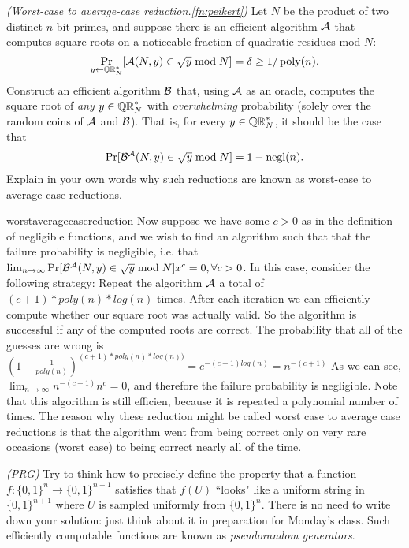 \begin{questions}
  \question[6] 
	\emph{(Worst-case to average-case reduction.\cref{fn:peikert})}
    Let $N$ be the product of two distinct $n$-bit primes,
    and suppose there is an efficient algorithm $\mathcal{A}$ that computes
    square roots on a noticeable fraction of quadratic residues mod
    $N$: \[ \Pr_{y \gets \mathbb{QR}_{N}^{*}}[\mathcal{A}(N, y) \in \sqrt{y} \bmod N] =
    \delta \geq 1/\operatorname{poly}(n). \] Construct an efficient algorithm
    $\mathcal{B}$ that, using $\mathcal{A}$ as an oracle, computes the square root
    of \emph{any} $y \in \mathbb{QR}_{N}^{*}$ with \emph{overwhelming} probability
    (solely over the random coins of $\mathcal{A}$ and $\mathcal{B}$).  That is,
    for every $y \in \mathbb{QR}_{N}^{*}$, it should be the case that
    \[ \Pr[\mathcal{B}^{\mathcal{A}}(N, y) \in \sqrt{y} \bmod N] = 1 - \operatorname{negl}(n). \]
    Explain in your own words why such reductions are known as worst-case to average-case reductions.
		\begin{mysolution}{worstaveragecasereduction}
      Now suppose we have some $c>0$ as in the definition of negligible functions, and we wish to find an algorithm such that that the failure probability is negligible, i.e. that $\lim_{n \to \infty} \Pr[\mathcal{B}^{\mathcal{A}}(N, y) \in \sqrt{y} \bmod N] x^c = 0, \forall c>0$. In this case, consider the following strategy: Repeat the algorithm $\mathcal{A}$ a total of $(c+1)*poly(n) * log(n)$ times. After each iteration we can efficiently compute whether our square root was actually valid. So the algorithm is successful if any of the computed roots are correct. The probability that all of the guesses are wrong is $(1-\frac{1}{poly(n)})^{(c+1) * poly(n) * log(n))} = e^{- (c+1) log(n)} = n^{-(c+1)}$ As we can see, $\lim_{n \to \infty} n^{-(c+1)} n^{c} = 0$, and therefore the failure probability is negligible. Note that this algorithm is still efficien, because it is repeated a polynomial number of times. The reason why these reduction might be called worst case to average case reductions is that the algorithm went from being correct only on very rare occasions (worst case) to being correct nearly all of the time.
    \end{mysolution}




{
\renewcommand*{\thefootnote}{$\clubsuit$}
  \question\label{qu:prg} 
	\emph{(PRG)} Try to think how to precisely define the property that a function $f:\{0,1\}^n \to \{0,1\}^{n+1}$ satisfies that $f(U)$ ``looks" like a uniform string in $\{0,1\}^{n+1}$ where $U$ is sampled uniformly from $\{0,1\}^n$. There is no need to write down your solution: just think about it in preparation for Monday's class. Such efficiently computable functions are known as \emph{pseudorandom generators}. 
}




\end{questions}



